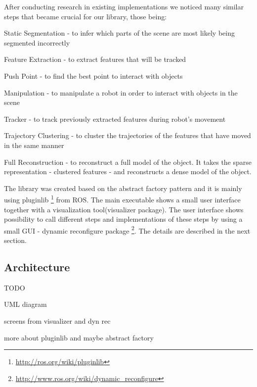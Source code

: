 After conducting research in existing implementations we noticed many similar steps that became crucial for our library, those being:

\item Static Segmentation - to infer which parts of the scene are most likely being segmented incorrectly
\item Feature Extraction - to extract features that will be tracked
\item Push Point - to find the best point to interact with objects
\item Manipulation - to manipulate a robot in order to interact with objects in the scene
\item Tracker - to track previously extracted features during robot's movement
\item Trajectory Clustering - to cluster the trajectories of the features that have moved in the same manner
\item Full Reconstruction - to reconstruct a full model of the object. It takes the sparse representation - clustered features - and reconstructs a dense model of the object.



The library was created based on the abstract factory pattern and it is mainly using pluginlib \footnote{\url{http://ros.org/wiki/pluginlib}} from ROS. The main executable  shows a small user interface together with a visualization tool(visualizer package). The user interface shows possibility to call different steps and implementations of these steps by using a small GUI - dynamic reconfigure package \footnote{\url{http://www.ros.org/wiki/dynamic_reconfigure}}. The details are described in the next section.

\subsection{Architecture}
TODO		
\item UML diagram
\item screens from visualizer and dyn rec
\item more about pluginlib and maybe abstract factory
